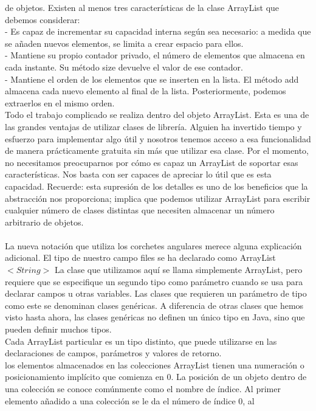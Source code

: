 \documentclass[11pt,a4paper]{article}
\begin{document}
	de objetos. Existen al menos tres características de la clase ArrayList que debemos considerar:
	\\- Es capaz de incrementar su capacidad interna según sea necesario: a medida que se añaden
	nuevos elementos, se limita a crear espacio para ellos.
	\\- Mantiene su propio contador privado, el número de elementos que almacena en cada instante.
	Su método size devuelve el valor de ese contador.
	\\- Mantiene el orden de los elementos que se inserten en la lista. El método add almacena cada
	nuevo elemento al final de la lista. Posteriormente, podemos extraerlos en el mismo orden.\\
	Todo el trabajo complicado se realiza
	dentro del objeto ArrayList. Esta es una de las grandes ventajas de utilizar clases de librería.
	Alguien ha invertido tiempo y esfuerzo para implementar algo útil y nosotros tenemos acceso a esa
	funcionalidad de manera prácticamente gratuita sin más que utilizar esa clase.
	Por el momento, no necesitamos preocuparnos por cómo es capaz un ArrayList de soportar
	esas características. Nos basta con ser capaces de apreciar lo útil que es esta capacidad. Recuerde:
	esta supresión de los detalles es uno de los beneficios que la abstracción nos proporciona; implica
	que podemos utilizar ArrayList para escribir cualquier número de clases distintas que necesiten
	almacenar un número arbitrario de objetos.\\
	\\
	La nueva notación que utiliza los corchetes angulares merece alguna explicación adicional. El tipo
	de nuestro campo files se ha declarado como
	ArrayList$<String>$ La clase que utilizamos aquí se llama simplemente ArrayList, pero requiere que se especifique
	un segundo tipo como parámetro cuando se usa para declarar campos u otras variables. Las clases
	que requieren un parámetro de tipo como este se denominan clases genéricas. A diferencia de
	otras clases que hemos visto hasta ahora, las clases genéricas no definen un único tipo en Java,
	sino que pueden definir muchos tipos.\\
	Cada ArrayList particular es un tipo distinto, que puede utilizarse
	en las declaraciones de campos, parámetros y valores de retorno.\\
	los elementos
	almacenados en las colecciones ArrayList tienen una numeración o posicionamiento implícito
	que comienza en 0. La posición de un objeto dentro de una colección se conoce comúnmente como
	el nombre de índice. Al primer elemento añadido a una colección se le da el número de índice 0, al
\end{document}
